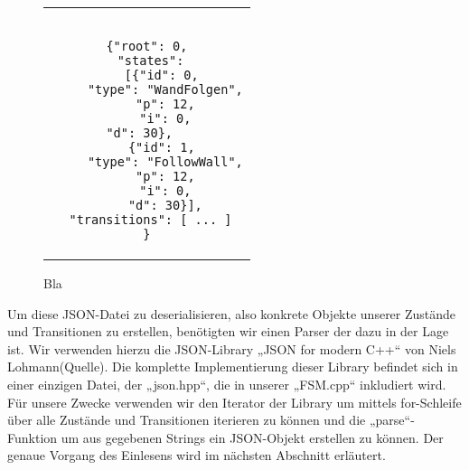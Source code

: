 \begin{figure}[thp]
\begin{tabular}{c}
\begin{lstlisting}[style=json]

{"root": 0,
 "states":
    [{"id": 0,
     "type": "WandFolgen",
     "p": 12,
     "i": 0,
     "d": 30},       
    {"id": 1,
     "type": "FollowWall",
     "p": 12,
     "i": 0,
     "d": 30}],
 "transitions": [ ... ]
}

\end{lstlisting}
\end{tabular}
\centering
\caption{Bla}
\end{figure}
Um diese JSON-Datei zu deserialisieren, also konkrete Objekte unserer Zustände und Transitionen zu erstellen, benötigten wir einen Parser der dazu in der Lage ist. Wir verwenden hierzu die JSON-Library „JSON for modern C++“ von Niels Lohmann(Quelle).
Die komplette Implementierung dieser Library befindet sich in einer einzigen Datei, der „json.hpp“, die in unserer „FSM.cpp“ inkludiert wird.
Für unsere Zwecke verwenden wir den Iterator der Library um mittels for-Schleife über alle Zustände und Transitionen iterieren zu können und die „parse“-Funktion um aus gegebenen Strings ein JSON-Objekt erstellen zu können.
Der genaue Vorgang des Einlesens wird im nächsten Abschnitt erläutert.